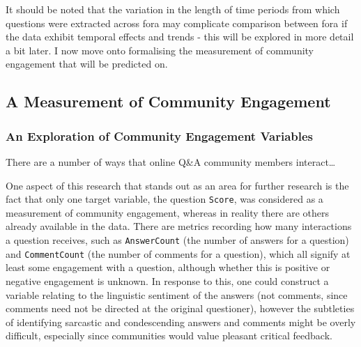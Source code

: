 \documentclass[11pt,preprint, authoryear]{article}
\numberwithin{equation}{section}
\begin{document}
It should be noted that the variation in the length of time periods from
which questions were extracted across fora may complicate comparison
between fora if the data exhibit temporal effects and trends - this will
be explored in more detail a bit later. I now move onto formalising the
measurement of community engagement that will be predicted on.

\subsection{A Measurement of Community
Engagement}\label{a-measurement-of-community-engagement}

\subsubsection{\texorpdfstring{An Exploration of Community Engagement
Variables
\label{Vars}}{An Exploration of Community Engagement Variables }}\label{an-exploration-of-community-engagement-variables}

There are a number of ways that online Q\&A community members
interact\ldots{}

One aspect of this research that stands out as an area for further
research is the fact that only one target variable, the question
\texttt{Score}, was considered as a measurement of community engagement,
whereas in reality there are others already available in the data. There
are metrics recording how many interactions a question receives, such as
\texttt{AnswerCount} (the number of answers for a question) and
\texttt{CommentCount} (the number of comments for a question), which all
signify at least some engagement with a question, although whether this
is positive or negative engagement is unknown. In response to this, one
could construct a variable relating to the linguistic sentiment of the
answers (not comments, since comments need not be directed at the
original questioner), however the subtleties of identifying sarcastic
and condescending answers and comments might be overly difficult,
especially since communities would value pleasant critical feedback.
\end{document}
